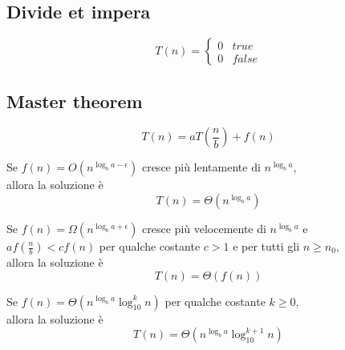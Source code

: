 \documentclass{article}
\begin{document}
\pagebreak

\subsection{Divide et impera}

\begin{equation}
    T(n) =
    \begin{cases}
        0 & true \\
        0 & false
    \end{cases}
\end{equation}

\subsection{Master theorem}
\[T(n) = aT\left(\frac{n}{b}\right) + f(n)\]

Se \(f(n) = O\left(n^{\log_b a - \epsilon}\right)\) cresce più lentamente di \(n^{\log_b a}\), \\
allora la soluzione è
\[T(n) = \Theta\left(n^{\log_b a}\right)\]

Se \(f(n) = \Omega\left(n^{\log_b a + \epsilon}\right)\) cresce più velocemente di \(n^{\log_b a}\) e \\
\(a f(\frac{n}{b}) < c f(n)\) per qualche costante \(c > 1\) e per tutti gli \(n \geq n_0\), \\
allora la soluzione è
\[T(n) = \Theta\left(f(n)\right)\]

Se \(f(n) = \Theta\left(n^{\log_b a} \log_{10}^k n\right)\) per qualche costante \(k \geq 0\), \\
allora la soluzione è
\[T(n) = \Theta\left(n^{\log_b a} \log_{10}^{k+1} n\right)\]
\end{document}
